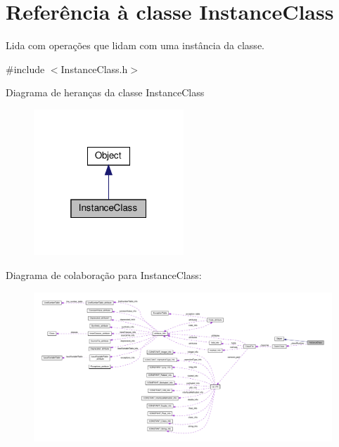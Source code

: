 \hypertarget{classInstanceClass}{}\section{Referência à classe Instance\+Class}
\label{classInstanceClass}


Lida com operações que lidam com uma instância da classe.  




{\ttfamily \#include $<$Instance\+Class.\+h$>$}



Diagrama de heranças da classe Instance\+Class\nopagebreak
\begin{figure}[H]
\begin{center}
\leavevmode
\includegraphics[width=160pt]{classInstanceClass__inherit__graph}
\end{center}
\end{figure}


Diagrama de colaboração para Instance\+Class\+:
\nopagebreak
\begin{figure}[H]
\begin{center}
\leavevmode
\includegraphics[width=350pt]{classInstanceClass__coll__graph}
\end{center}
\end{figure}
